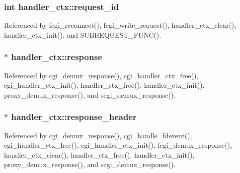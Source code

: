 \hypertarget{structhandler__ctx_a07b80fc0931f7f0db765784c1f9dfce6}{
\subsubsection[{request\-\_\-id}]{\setlength{\rightskip}{0pt plus 5cm}int handler\-\_\-ctx\-::request\-\_\-id}}\label{structhandler__ctx_a07b80fc0931f7f0db765784c1f9dfce6}


Referenced by fcgi\-\_\-reconnect(), fcgi\-\_\-write\-\_\-request(), handler\-\_\-ctx\-\_\-clear(), handler\-\_\-ctx\-\_\-init(), and S\-U\-B\-R\-E\-Q\-U\-E\-S\-T\-\_\-\-F\-U\-N\-C().

\hypertarget{structhandler__ctx_a557457324a347639343f267ed75a0cab}{
\subsubsection[{response}]{ $\ast$ handler\-\_\-ctx\-::response}}\label{structhandler__ctx_a557457324a347639343f267ed75a0cab}


Referenced by cgi\-\_\-demux\-\_\-response(), cgi\-\_\-handler\-\_\-ctx\-\_\-free(), cgi\-\_\-handler\-\_\-ctx\-\_\-init(), handler\-\_\-ctx\-\_\-free(), handler\-\_\-ctx\-\_\-init(), proxy\-\_\-demux\-\_\-response(), and scgi\-\_\-demux\-\_\-response().

\hypertarget{structhandler__ctx_a068867a5689012825e5eeb6ef432b1eb}{
\subsubsection[{response\-\_\-header}]{ $\ast$ handler\-\_\-ctx\-::response\-\_\-header}}\label{structhandler__ctx_a068867a5689012825e5eeb6ef432b1eb}


Referenced by cgi\-\_\-demux\-\_\-response(), cgi\-\_\-handle\-\_\-fdevent(), cgi\-\_\-handler\-\_\-ctx\-\_\-free(), cgi\-\_\-handler\-\_\-ctx\-\_\-init(), fcgi\-\_\-demux\-\_\-response(), handler\-\_\-ctx\-\_\-clear(), handler\-\_\-ctx\-\_\-free(), handler\-\_\-ctx\-\_\-init(), proxy\-\_\-demux\-\_\-response(), and scgi\-\_\-demux\-\_\-response().

